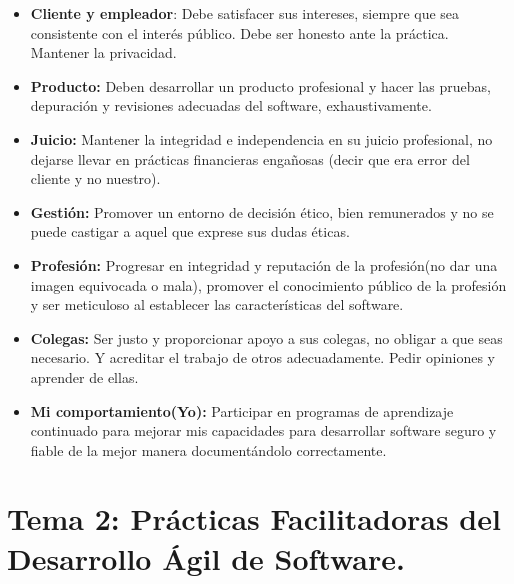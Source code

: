 \documentclass[12pt, twoside, openright]{report} %
\begin{document}
\begin{itemize}
\begin{itemize}
\begin{itemize}
    \item \textbf{Cliente y empleador}: Debe satisfacer sus intereses,
      siempre que sea consistente con el interés público. Debe ser
      honesto ante la práctica. Mantener la privacidad.
      
    \item \textbf{Producto:} Deben desarrollar un producto profesional y
      hacer las pruebas, depuración y revisiones adecuadas del software,
      exhaustivamente.
      
    \item \textbf{Juicio:} Mantener la integridad e independencia en su
      juicio profesional, no dejarse llevar en prácticas financieras
      engañosas (decir que era error del cliente y no nuestro).
      
    \item \textbf{Gestión:} Promover un entorno de decisión ético, bien
      remunerados y no se puede castigar a aquel que exprese sus dudas
      éticas.
      
    \item \textbf{Profesión:} Progresar en integridad y reputación de la
      profesión(no dar una imagen equivocada o mala), promover el
      conocimiento público de la profesión y ser meticuloso al
      establecer las características del software.
      
    \item \textbf{Colegas:} Ser justo y proporcionar apoyo a sus colegas, no
      obligar a que seas necesario. Y acreditar el trabajo de otros
      adecuadamente. Pedir opiniones y aprender de ellas.
      
    \item \textbf{Mi comportamiento(Yo):} Participar en programas de
      aprendizaje continuado para mejorar mis capacidades para
      desarrollar software seguro y fiable de la mejor manera
      documentándolo correctamente.
      
    \end{itemize}
  \end{itemize}
\end{itemize}
\chapter{Tema 2: Prácticas Facilitadoras del Desarrollo Ágil de
Software.}
\end{document}
